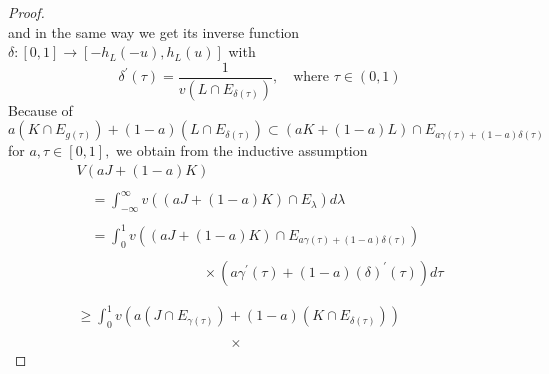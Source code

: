\documentclass[oneside]{book}
\theoremstyle{definition}
\begin{document}
\begin{proof}
\[\]
and in the same way
we get its inverse function $ \delta:[0,1] \rightarrow\left[-h_{L}(-u), h_{L}(u)\right]$     with 
\[
\delta^{\prime}(\tau)=\frac{1}{v\left(L \cap E_{\delta(\tau)}\right)}, \quad  \text{where } \tau \in(0,1)
\]
Because of
\[
a\left(K \cap E_{g(\tau)}\right)+(1-a)\left(L \cap E_{\delta(\tau)}\right) \subset(a K+(1-a) L) \cap E_{a \gamma(\tau)+(1-a) \delta(\tau)}
\]
for $a, \tau \in[0,1],$ we obtain from the inductive assumption
\[
\begin{array}{l}
V(a J+(1-a) K) \\\\
\quad=\int_{-\infty}^{\infty} v\left((a J+(1-a) K) \cap E_{\lambda}\right) d \lambda \\\\
\quad=\int_{0}^{1} v\left((a J+(1-a) K) \cap E_{a \gamma(\tau)+(1-a) \delta(\tau)}\right) \\\\
 \quad  \quad \quad \quad \quad \quad \quad \quad \quad \times
\left(a \gamma^{\prime}(\tau)+(1-a) (\delta)^{\prime}(\tau)\right) d \tau
\\\\\\
\geq \int_{0}^{1} v\left(a\left(J \cap E_{\gamma(\tau)}\right)+(1-a)\left(K \cap E_{\delta(\tau)}\right)\right)
\\\\
 \quad \quad \quad \quad \quad \quad \quad \quad \quad \quad \quad
 
 \times
 

\end{array}\]
\end{proof}
\end{document}
